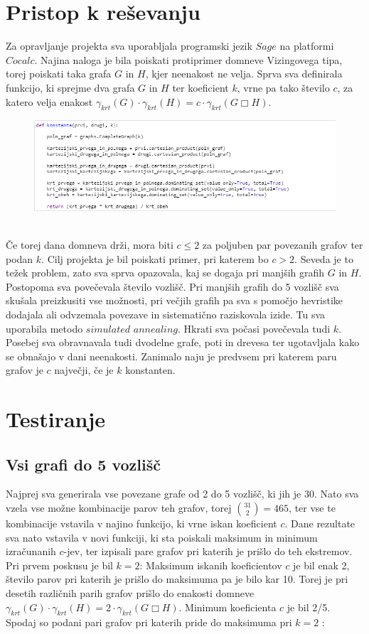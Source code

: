 \documentclass[12pt, a4paper]{article}
\begin{document}
\section{Pristop k reševanju}
Za opravljanje projekta sva uporabljala programski jezik $Sage$ na platformi $Cocalc$. Najina naloga je bila poiskati protiprimer domneve Vizingovega tipa, torej poiskati taka grafa $G$ in $H$, kjer neenakost ne velja. Sprva sva definirala funkcijo, ki sprejme dva grafa $G$ in $H$ ter koeficient $k$, vrne pa tako število $c$, za katero velja enakost $\gamma_{krt}(G) \cdot \gamma_{krt}(H) = c \cdot \gamma_{krt}(G \Box H)$. 
\begin{figure}[h!]
\centering
\includegraphics[width=\linewidth]{slika_1}
\end{figure} \\
Če torej dana domneva drži, mora biti $c \leq 2$ za poljuben par povezanih grafov ter podan $k$. Cilj projekta je bil poiskati primer, pri katerem bo $c>2$. Seveda je to težek problem, zato sva sprva opazovala, kaj se dogaja pri manjših grafih $G$ in $H$. Postopoma sva povečevala število vozlišč. Pri manjših grafih do 5 vozlišč sva skušala preizkusiti vse možnosti, pri večjih grafih pa sva s pomočjo hevristike dodajala ali odvzemala povezave in sistematično raziskovala izide. Tu sva uporabila metodo $simulated$ $annealing$. Hkrati sva počasi povečevala tudi $k$. Posebej sva obravnavala tudi dvodelne grafe, poti in drevesa ter ugotavljala kako se obnašajo v dani neenakosti. Zanimalo naju je predvsem pri katerem paru grafov je $c$ največji, če je $k$ konstanten.

\section{Testiranje}
\subsection{Vsi grafi do 5 vozlišč}
Najprej sva generirala vse povezane grafe od 2 do 5 vozlišč, ki jih je 30. Nato sva vzela vse možne kombinacije parov teh grafov, torej $\binom{31}{2}=465$, ter vse te kombinacije vstavila v najino funkcijo, ki vrne iskan koeficient $c$. Dane rezultate sva nato vstavila v novi funkciji, ki sta poiskali maksimum in minimum izračunanih $c$-jev, ter izpisali pare grafov pri katerih je prišlo do teh ekstremov. \\
Pri prvem poskusu je bil $k=2$: Maksimum iskanih koeficientov $c$ je bil enak 2, število parov pri katerih je prišlo do maksimuma pa je bilo kar 10. Torej je pri desetih različnih parih grafov prišlo do enakosti domneve $\gamma_{krt}(G) \cdot \gamma_{krt}(H) = 2 \cdot \gamma_{krt}(G \Box H)$. Minimum koeficienta $c$ je bil 2/5. \\
Spodaj so podani pari grafov pri katerih pride do maksimuma pri $k=2$ :
\end{document}
